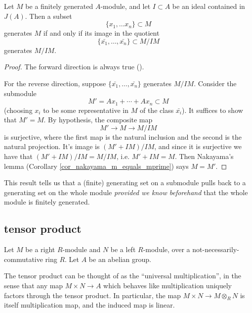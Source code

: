 \documentclass[12pt]{article}
\begin{document}
\begin{corollary}
	Let $M$ be a finitely generated $A$-module, and let $I\subset A$ be an ideal contained in $J(A)$. Then a subset 
	\begin{equation*}
		\{x_1,\dots x_n\} \subset M
	\end{equation*}
	generates $M$ if and only if its image in the quotient 
	\begin{equation*}
		\{\bar{x_1}, \dots, \bar{x_n}\} \subset M/IM
	\end{equation*}
	generates $M/IM$.
\end{corollary}
\begin{proof}
	The forward direction is always true ().

	For the reverse direction, suppose $\{\bar{x_1}, \dots, \bar{x_n}\}$ generates $M/IM$. Consider the submodule 
	\begin{equation*}
		M' = Ax_1 + \cdots + Ax_n \subset M 
	\end{equation*}
	(choosing $x_i$ to be some representative in $M$ of the class $\bar{x_i}$). It suffices to show that $M'=M$. By hypothesis, the composite map 
	\begin{equation*}
		M' \longrightarrow M \longrightarrow M/IM
	\end{equation*}
	is surjective, where the first map is the natural inclusion and the second is the natural projection. It's image is $(M'+IM)/IM$, and since it is surjective we have that $(M'+IM)/IM=M/IM$, i.e. $M'+IM=M$. Then Nakayama's lemma (Corollary \ref{cor_nakayama_m_equals_mprime}) says $M=M'$.
\end{proof}

\begin{remark}
	This result tells us that a (finite) generating set on a submodule pulls back to a generating set on the whole module \emph{provided we know beforehand} that the whole module is finitely generated.
\end{remark}

\subsection{tensor product} %

Let $M$ be a right $R$-module and $N$ be a left $R$-module, over a not-necessarily-commutative ring $R$. Let $A$ be an abelian group.

The tensor product can be thought of as the ``universal multiplication'', in the sense that any map $M\times N\to A$ which behaves like multiplication uniquely factors through the tensor product. In particular, the map $M\times N\to M\otimes_R N$ is itself multiplication map, and the induced map is linear.
\end{document}
